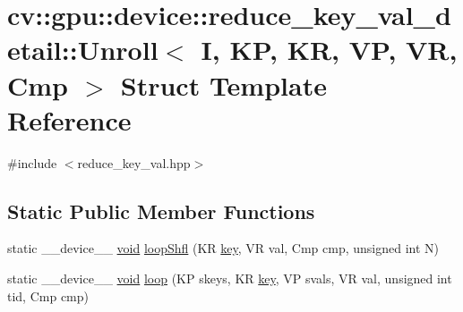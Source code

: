 \hypertarget{structcv_1_1gpu_1_1device_1_1reduce__key__val__detail_1_1Unroll}{\section{cv\-:\-:gpu\-:\-:device\-:\-:reduce\-\_\-key\-\_\-val\-\_\-detail\-:\-:Unroll$<$ I, K\-P, K\-R, V\-P, V\-R, Cmp $>$ Struct Template Reference}
\label{structcv_1_1gpu_1_1device_1_1reduce__key__val__detail_1_1Unroll}
}


{\ttfamily \#include $<$reduce\-\_\-key\-\_\-val.\-hpp$>$}

\subsection*{Static Public Member Functions}
\begin{DoxyCompactItemize}
\item 
static \-\_\-\-\_\-device\-\_\-\-\_\- \hyperlink{legacy_8hpp_a8bb47f092d473522721002c86c13b94e}{void} \hyperlink{structcv_1_1gpu_1_1device_1_1reduce__key__val__detail_1_1Unroll_a4b58709ed74d7cd37b467f397197a47e}{loop\-Shfl} (K\-R \hyperlink{core__c_8h_a68cf695b604d08c0b6f6f6bb282a6586}{key}, V\-R val, Cmp cmp, unsigned int N)
\item 
static \-\_\-\-\_\-device\-\_\-\-\_\- \hyperlink{legacy_8hpp_a8bb47f092d473522721002c86c13b94e}{void} \hyperlink{structcv_1_1gpu_1_1device_1_1reduce__key__val__detail_1_1Unroll_ae22828b2fbe22a37e5b1c3e24449a691}{loop} (K\-P skeys, K\-R \hyperlink{core__c_8h_a68cf695b604d08c0b6f6f6bb282a6586}{key}, V\-P svals, V\-R val, unsigned int tid, Cmp cmp)
\end{DoxyCompactItemize}


